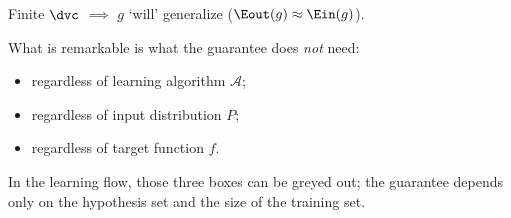 \begin{moral}
    Finite \(\dvc\) \(\implies\) \(g\) `will' generalize (\(\Eout(g) \approx
    \Ein(g)\)).
\end{moral}

What is remarkable is what the guarantee does \emph{not} need:

\begin{itemize}
    \item regardless of learning algorithm \(\mathcal{A}\);
    \item regardless of input distribution \(P\);
    \item regardless of target function \(f\).
\end{itemize}

In the learning flow, those three boxes can be greyed out; the guarantee
depends only on the hypothesis set and the size of the training set.

